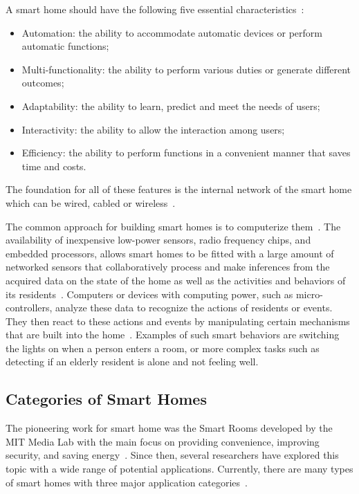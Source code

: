 A smart home should have the following five essential characteristics~\parencite{leSmartHomesOlder2012}:
\begin{itemize}
    \item Automation: the ability to accommodate automatic devices or perform automatic functions;
    \item Multi-functionality: the ability to perform various duties or generate different outcomes;
    \item Adaptability: the ability to learn, predict and meet the needs of users;
    \item Interactivity: the ability to allow the interaction among users;
    \item Efficiency: the ability to perform functions in a convenient manner that saves time and costs.
\end{itemize}
The foundation for all of these features is the internal network of the smart home which can be wired, cabled or wireless~\parencite{jiangSmartHomeResearch2004}.

The common approach for building smart homes is to computerize them~\parencite{desilvaStateArtSmart2012}. The availability of inexpensive low-power sensors, radio frequency chips, and embedded processors, allows smart homes to be fitted with a large amount of networked sensors that collaboratively process and make inferences from the acquired data on the state of the home as well as the activities and behaviors of its residents~\parencite{dingSensorTechnologySmart2011}. Computers or devices with computing power, such as micro-controllers, analyze these data to recognize the actions of residents or events. They then react to these actions and events by manipulating certain mechanisms that are built into the home~\parencite{desilvaStateArtSmart2012}. Examples of such smart behaviors are switching the lights on when a person enters a room, or more complex tasks such as detecting if an elderly resident is alone and not feeling well.

\subsection{Categories of Smart Homes}

The pioneering work for smart home was the Smart Rooms developed by the MIT Media Lab with the main focus on providing convenience, improving security, and saving energy~\parencite{pentlandSmartRooms1996,dingSensorTechnologySmart2011}. Since then, several researchers have explored this topic with a wide range of potential applications. Currently, there are many types of smart homes with three major application categories~\parencite{desilvaStateArtSmart2012}.

